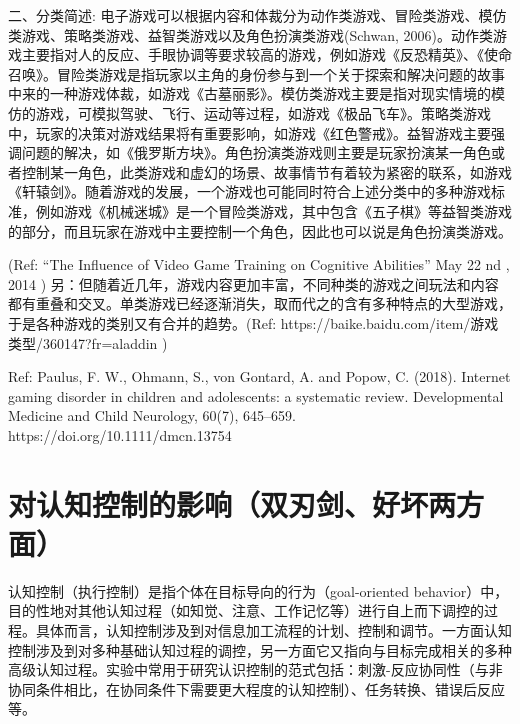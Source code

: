 二、分类简述:
  电子游戏可以根据内容和体裁分为动作类游戏、冒险类游戏、模仿类游戏、策略类游戏、益智类游戏以及角色扮演类游戏(Schwan, 2006)。动作类游戏主要指对人的反应、手眼协调等要求较高的游戏，例如游戏《反恐精英》、《使命召唤》。冒险类游戏是指玩家以主角的身份参与到一个关于探索和解决问题的故事中来的一种游戏体裁，如游戏《古墓丽影》。模仿类游戏主要是指对现实情境的模仿的游戏，可模拟驾驶、飞行、运动等过程，如游戏《极品飞车》。策略类游戏中，玩家的决策对游戏结果将有重要影响，如游戏《红色警戒》。益智游戏主要强调问题的解决，如《俄罗斯方块》。角色扮演类游戏则主要是玩家扮演某一角色或者控制某一角色，此类游戏和虚幻的场景、故事情节有着较为紧密的联系，如游戏《轩辕剑》。随着游戏的发展，一个游戏也可能同时符合上述分类中的多种游戏标准，例如游戏《机械迷城》是一个冒险类游戏，其中包含《五子棋》等益智类游戏的部分，而且玩家在游戏中主要控制一个角色，因此也可以说是角色扮演类游戏。
                         
         (Ref:      “The Influence of Video Game Training on Cognitive Abilities” May 22 nd , 2014 \cite{})
另：但随着近几年，游戏内容更加丰富，不同种类的游戏之间玩法和内容都有重叠和交叉。单类游戏已经逐渐消失，取而代之的含有多种特点的大型游戏，于是各种游戏的类别又有合并的趋势。(Ref: https://baike.baidu.com/item/游戏类型/360147?fr=aladdin \cite{})

Ref: Paulus, F. W., Ohmann, S., von Gontard, A. and  Popow, C. (2018). Internet gaming disorder in children and adolescents: a systematic review. Developmental Medicine and Child Neurology, 60(7), 645–659. https://doi.org/10.1111/dmcn.13754


\section{对认知控制的影响（双刃剑、好坏两方面） }




 认知控制（执行控制）是指个体在目标导向的行为（goal-oriented behavior）中，目的性地对其他认知过程（如知觉、注意、工作记忆等）进行自上而下调控的过程。具体而言，认知控制涉及到对信息加工流程的计划、控制和调节。一方面认知控制涉及到对多种基础认知过程的调控，另一方面它又指向与目标完成相关的多种高级认知过程。实验中常用于研究认识控制的范式包括：刺激-反应协同性（与非协同条件相比，在协同条件下需要更大程度的认知控制）、任务转换、错误后反应等。
  
